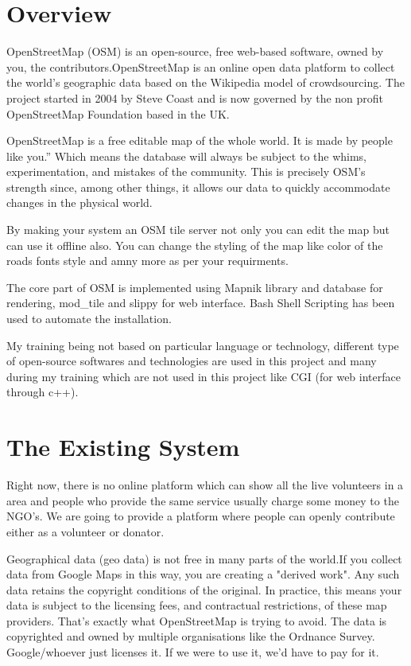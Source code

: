 \section{Overview}
OpenStreetMap (OSM) is an open-source, free web-based software, owned by you, the contributors.OpenStreetMap is an online open data platform to collect the world's geographic data based on the Wikipedia model of crowdsourcing. The project started in 2004 by Steve Coast and is now governed by the non profit OpenStreetMap Foundation based in the UK. 


OpenStreetMap is a free editable map of the whole world. It is made by people like you.” Which
means the database will always be subject to the whims, experimentation, and mistakes of the
community. This is precisely OSM’s strength since, among other things, it allows our data to
quickly accommodate changes in the physical world.


By making your system an OSM tile server not only you can edit the map but can use it offline
also. You can change the styling of the map like color of the roads fonts style and amny more as
per your requirments.


The core part of OSM is implemented using Mapnik library and database for rendering, mod\_tile and slippy
for web interface. Bash Shell Scripting has been used to automate the installation.


My training being not based on particular language or technology, different type of open-source softwares and technologies are
used in this project and many during my training which are not used in this
project like CGI (for web interface through c++).

\section{The Existing System}
Right now, there is no online platform which can show all the live volunteers in a area and people who provide the same service usually charge some money to the NGO’s. We are going to provide a platform where people can openly contribute either as a volunteer or donator. 


Geographical data (geo data) is not free in many parts of the world.If you collect data from Google Maps in this way, you are creating a "derived work". Any such data retains the copyright conditions of the original. In practice, this means your data is subject to the licensing fees, and contractual restrictions, of these map providers. That's exactly what OpenStreetMap is trying to avoid. The data is copyrighted and owned by multiple organisations like the Ordnance Survey. Google/whoever just licenses it. If we were to use it, we'd have to pay for it. 

